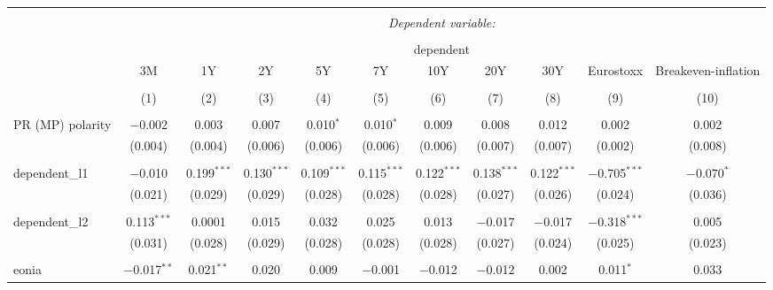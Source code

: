 

\begin{table}[!htbp] \centering 
  \caption{} 
  \label{} 
  \begin{adjustbox}{width=1.35\textwidth}
\begin{tabular}{@{\extracolsep{5pt}}lcccccccccc} 
\\[-1.8ex]\hline 
\hline \\[-1.8ex] 
 & \multicolumn{10}{c}{\textit{Dependent variable:}} \\ 
\cline{2-11} 
\\[-1.8ex] & \multicolumn{10}{c}{dependent} \\ 
 & 3M & 1Y & 2Y & 5Y & 7Y & 10Y & 20Y & 30Y & Eurostoxx & Breakeven-inflation \\ 
\\[-1.8ex] & (1) & (2) & (3) & (4) & (5) & (6) & (7) & (8) & (9) & (10)\\ 
\hline \\[-1.8ex] 
 PR (MP) polarity & $-$0.002 & 0.003 & 0.007 & 0.010$^{*}$ & 0.010$^{*}$ & 0.009 & 0.008 & 0.012 & 0.002 & 0.002 \\ 
  & (0.004) & (0.004) & (0.006) & (0.006) & (0.006) & (0.006) & (0.007) & (0.007) & (0.002) & (0.008) \\ 
  & & & & & & & & & & \\ 
 dependent\_l1 & $-$0.010 & 0.199$^{***}$ & 0.130$^{***}$ & 0.109$^{***}$ & 0.115$^{***}$ & 0.122$^{***}$ & 0.138$^{***}$ & 0.122$^{***}$ & $-$0.705$^{***}$ & $-$0.070$^{*}$ \\ 
  & (0.021) & (0.029) & (0.029) & (0.028) & (0.028) & (0.028) & (0.027) & (0.026) & (0.024) & (0.036) \\ 
  & & & & & & & & & & \\ 
 dependent\_l2 & 0.113$^{***}$ & 0.0001 & 0.015 & 0.032 & 0.025 & 0.013 & $-$0.017 & $-$0.017 & $-$0.318$^{***}$ & 0.005 \\ 
  & (0.031) & (0.028) & (0.029) & (0.028) & (0.028) & (0.028) & (0.027) & (0.024) & (0.025) & (0.023) \\ 
  & & & & & & & & & & \\ 
 eonia & $-$0.017$^{**}$ & 0.021$^{**}$ & 0.020 & 0.009 & $-$0.001 & $-$0.012 & $-$0.012 & 0.002 & 0.011$^{*}$ & 0.033 \\ 

\end{tabular}
\end{adjustbox}
\end{table}
